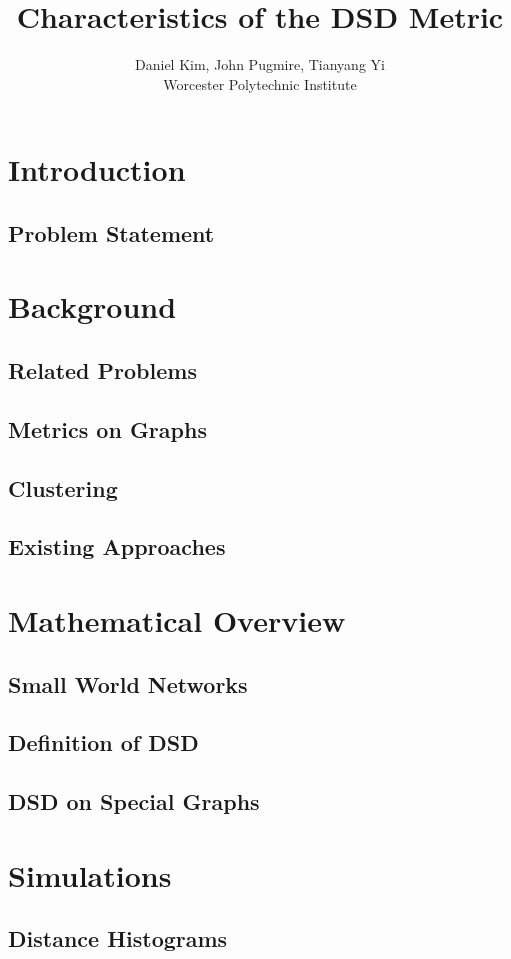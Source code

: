 \documentclass[11pt,oneside]{report}
\theoremstyle{definition}
\begin{document}
\title{Characteristics of the DSD Metric}
\author{Daniel Kim, John Pugmire, Tianyang Yi\\Worcester Polytechnic Institute\\}
\maketitle
\tableofcontents


\chapter{Introduction}

\section{Problem Statement}

\chapter{Background}

\section{Related Problems}

\section{Metrics on Graphs}

\section{Clustering}

\section{Existing Approaches}


\chapter{Mathematical Overview}
\section{Small World Networks}


\section{Definition of DSD}


\section{DSD on Special Graphs}


\chapter{Simulations}


\section{Distance Histograms}

\end{document}
